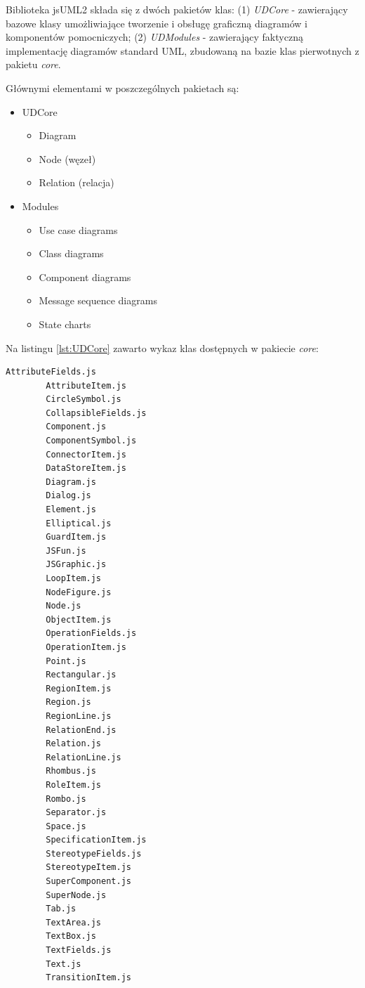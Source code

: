         Biblioteka jsUML2 składa się z dwóch pakietów klas: (1) \emph{UDCore} - zawierający bazowe klasy umożliwiające tworzenie i obsługę graficzną diagramów i komponentów pomocniczych; (2) \emph{UDModules} - zawierający faktyczną implementację diagramów standard UML, zbudowaną na bazie klas pierwotnych z pakietu \emph{core}.

        Głównymi elementami w poszczególnych pakietach są:

        \begin{itemize}
          \item UDCore
            \begin{itemize}
              \item Diagram
              \item Node (węzeł)
              \item Relation (relacja)
            \end{itemize}
          \item Modules 
            \begin{itemize}
              \item Use case diagrams
              \item Class diagrams
              \item Component diagrams
              \item Message sequence diagrams
              \item State charts
            \end{itemize}
        \end{itemize}

        Na listingu \ref{lst:UDCore} zawarto wykaz klas dostępnych w pakiecie \emph{core}:

        \begin{lstlisting}[caption={Klasy bazowe jsUML2}, label={lst:UDCore}]
        AttributeFields.js
        AttributeItem.js
        CircleSymbol.js
        CollapsibleFields.js
        Component.js
        ComponentSymbol.js
        ConnectorItem.js
        DataStoreItem.js
        Diagram.js
        Dialog.js
        Element.js
        Elliptical.js
        GuardItem.js
        JSFun.js
        JSGraphic.js
        LoopItem.js
        NodeFigure.js
        Node.js
        ObjectItem.js
        OperationFields.js
        OperationItem.js
        Point.js
        Rectangular.js
        RegionItem.js
        Region.js
        RegionLine.js
        RelationEnd.js
        Relation.js
        RelationLine.js
        Rhombus.js
        RoleItem.js
        Rombo.js
        Separator.js
        Space.js
        SpecificationItem.js
        StereotypeFields.js
        StereotypeItem.js
        SuperComponent.js
        SuperNode.js
        Tab.js
        TextArea.js
        TextBox.js
        TextFields.js
        Text.js
        TransitionItem.js
        \end{lstlisting}

